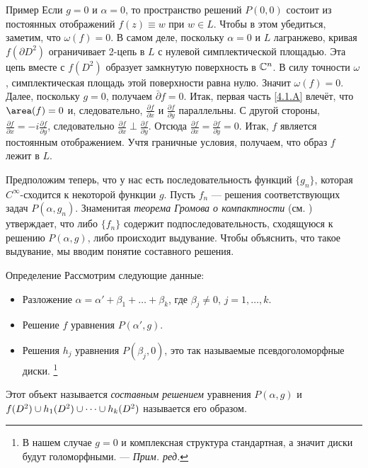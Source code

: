 \begin{ex*}{Пример}
Если $g = 0$ и $\alpha = 0$, то пространство решений $P (0, 0)$ состоит из постоянных отображений $f (z) \equiv w$ при $w \in L$.
Чтобы в этом убедиться, заметим, что $\omega (f) = 0$.
В самом деле, поскольку $\alpha = 0$ и $L$ лагранжево, кривая $f (\partial D^2)$ ограничивает 2-цепь в $L$ с нулевой симплектической площадью.
Эта цепь вместе с $f (D^2)$ образует замкнутую поверхность в $\mathbb{C}^n$.
В силу точности $\omega$, симплектическая площадь этой поверхности равна нулю.
Значит $\omega (f) = 0$.
Далее, поскольку $g = 0$, получаем $\bar\partial f=0$.
Итак, первая часть \ref{4.1.A} влечёт, что $\area (f) = 0$ и, следовательно, $\tfrac{\partial f}{\partial x}$ и $\tfrac{\partial f}{\partial y}$ параллельны.
С другой стороны, $\tfrac{\partial f}{\partial x}=-i\tfrac{\partial f}{\partial y}$,
следовательно $\tfrac{\partial f}{\partial x}\perp\tfrac{\partial f}{\partial y}$.
Отсюда $\tfrac{\partial f}{\partial x}=\tfrac{\partial f}{\partial y}=0$.
Итак, $f$ является постоянным отображением.
Учтя граничные условия, получаем, что образ $f$ лежит в $L$.
\end{ex*}

Предположим теперь, что у нас есть последовательность функций
$\{g_n\}$, которая $C^\infty$-сходится к некоторой функции $g$. 
Пусть $f_n$ — решения соответствующих задач $P(\alpha, g_n)$.
Знаменитая \emph{теорема Громова о компактности} (см. \cite{G1,AL})
утверждает, что либо $\{f_n\}$ содержит подпоследовательность,
сходящуюся к решению $P (\alpha, g)$, либо происходит выдувание.
Чтобы объяснить, что такое выдувание, мы вводим понятие составного решения. 

\begin{ex*}{Определение}
Рассмотрим следующие данные:
\begin{itemize}
\item Разложение $\alpha = \alpha' + \beta_1 +\dots + \beta_k$, где $\beta_j \ne 0$, $j = 1,\dots,k$.
\item Решение $f$ уравнения $P (\alpha', g)$.
\item Решения $h_j$ уравнения  $P (\beta_j, 0)$, это так называемые псевдоголоморфные диски.%
\footnote{В нашем случае $g=0$ и комплексная структура стандартная, а значит диски будут голоморфными. — \textit{Прим. ред.}}
\end{itemize}
Этот объект называется \emph{составным
  решением} уравнения $P(\alpha,g)$ и 
$f(D^2)\z\cup h_1(D^2) \z\cup\dots\cup h_k (D^2)$ называется его образом.
\end{ex*}


